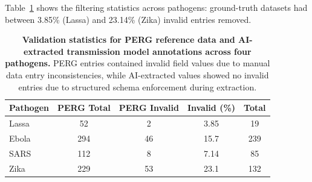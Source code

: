 
Table~\ref{tab:filtering_stats} shows the filtering statistics across pathogens: ground-truth datasets had between 3.85\% (Lassa) and 23.14\% (Zika) invalid entries removed.

\begin{table}[h]
\footnotesize
\centering
\caption{\textbf{Validation statistics for PERG reference data and AI-extracted transmission model annotations across four pathogens.} PERG entries contained invalid field values due to manual data entry inconsistencies, while AI-extracted values showed no invalid entries due to structured schema enforcement during extraction.}
\label{tab:filtering_stats}
\begin{tabular}{lcccc}
\toprule
\textbf{Pathogen} & \textbf{PERG Total} & \textbf{PERG Invalid} & \textbf{Invalid (\%)} & \textbf{\name{} Total} \\
\midrule
Lassa & 52 & 2 & 3.85 & 19 \\
Ebola & 294 & 46 & 15.7 & 239 \\
SARS & 112 & 8 & 7.14 & 85 \\
Zika & 229 & 53 & 23.1 & 132 \\
\bottomrule
\end{tabular}
\end{table}

